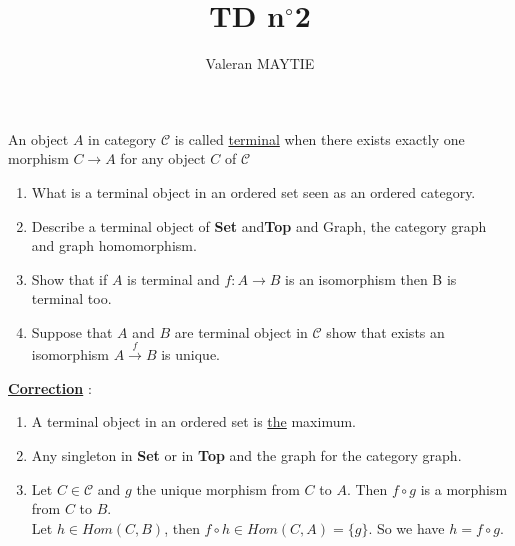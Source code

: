 \documentclass{article}
\title{TD n$^\circ$2}
\author{Valeran MAYTIE}
\date{}
\theoremstyle{plain}
\begin{document}
  \maketitle
  
  An object $A$ in category $\mathcal C$ is called \underline{terminal} when
  there exists exactly one morphism $C \to A$ for any object $C$ of $\mathcal C$

  \begin{enumerate}
    \item What is a terminal object in an ordered set seen as an ordered
      category.
    \item Describe a terminal object of {\bf Set} and{\bf Top} and Graph, the
      category graph and graph homomorphism.
    \item Show that if $A$ is terminal and $f : A \to B$ is an isomorphism then B
      is terminal too.
    \item Suppose that $A$ and $B$ are terminal object in $\mathcal C$ show that
      exists an isomorphism $A \xrightarrow{f} B$ is unique.
  \end{enumerate}

  \underline{\bf Correction} :

  \begin{enumerate}
    \item A terminal object in an ordered set is \underline{the} maximum.
    \item Any singleton in {\bf Set} or in {\bf Top} and the graph for the
      category graph.
    \item Let $C \in \mathcal C$ and $g$ the unique morphism from $C$ to $A$.
      Then $f \circ g$ is a morphism from $C$ to $B$. \\ Let $h \in Hom(C, B)$,
      then $f \circ h \in Hom(C, A) = \{g\}$. So we have $h = f \circ g$.
  \end{enumerate}
\end{document}

